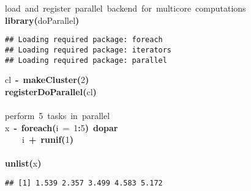 \documentclass[a4paper,12pt]{article}\usepackage{graphicx, color}
\makeatletter
\newcommand{\hlnumber}[1]{\textcolor[rgb]{0,0,0}{#1}}%
\newcommand{\hlfunctioncall}[1]{\textcolor[rgb]{0.501960784313725,0,0.329411764705882}{\textbf{#1}}}%
\newcommand{\hlkeyword}[1]{\textcolor[rgb]{0,0,0}{\textbf{#1}}}%
\newcommand{\hlargument}[1]{\textcolor[rgb]{0.690196078431373,0.250980392156863,0.0196078431372549}{#1}}%
\newcommand{\hlcomment}[1]{\textcolor[rgb]{0.180392156862745,0.6,0.341176470588235}{#1}}%
\newcommand{\hlassignement}[1]{\textcolor[rgb]{0,0,0}{\textbf{#1}}}%
\newcommand{\hlsymbol}[1]{\textcolor[rgb]{0,0,0}{#1}}%
\newcommand{\hlstd}[1]{\textcolor[rgb]{0,0,0}{#1}}%
\newenvironment{kframe}{%
 \def\FrameCommand##1{\hskip\@totalleftmargin \hskip-\fboxsep
 \colorbox{shadecolor}{##1}\hskip-\fboxsep
     \hskip-\linewidth \hskip-\@totalleftmargin \hskip\columnwidth}%
 \MakeFramed {\advance\hsize-\width
   \@totalleftmargin\z@ \linewidth\hsize
   \@setminipage}}%
 {\par\unskip\endMakeFramed}
\newenvironment{knitrout}{}{} %
\renewenvironment{knitrout}{\begin{footnotesize}}{\end{footnotesize}}
\makeatother
\begin{document}
\begin{knitrout}
\color{fgcolor}\begin{kframe}
\begin{flushleft}
\ttfamily\noindent
\hlcomment{\usebox{\hlnormalsizeboxhash}{\ }load{\ }and{\ }register{\ }parallel{\ }backend{\ }for{\ }multicore{\ }computations}\hspace*{\fill}\\
\hlstd{}\hlfunctioncall{library}\hlkeyword{(}\hlsymbol{doParallel}\hlkeyword{)}\mbox{}
\normalfont
\end{flushleft}
\begin{verbatim}
## Loading required package: foreach
## Loading required package: iterators
## Loading required package: parallel
\end{verbatim}
\begin{flushleft}
\ttfamily\noindent
\hlsymbol{cl}{\ }\hlassignement{\usebox{\hlnormalsizeboxlessthan}-}{\ }\hlfunctioncall{makeCluster}\hlkeyword{(}\hlnumber{2}\hlkeyword{)}\hspace*{\fill}\\
\hlstd{}\hlfunctioncall{registerDoParallel}\hlkeyword{(}\hlsymbol{cl}\hlkeyword{)}\hspace*{\fill}\\
\hlstd{}\hspace*{\fill}\\
\hlstd{}\hlcomment{\usebox{\hlnormalsizeboxhash}{\ }perform{\ }5{\ }tasks{\ }in{\ }parallel}\hspace*{\fill}\\
\hlstd{}\hlsymbol{x}{\ }\hlassignement{\usebox{\hlnormalsizeboxlessthan}-}{\ }\hlfunctioncall{foreach}\hlkeyword{(}\hlargument{i}{\ }\hlargument{=}{\ }\hlnumber{1}\hlkeyword{:}\hlnumber{5}\hlkeyword{)}{\ }\hlkeyword{\usebox{\hlnormalsizeboxpercent}dopar\usebox{\hlnormalsizeboxpercent}}{\ }\hlkeyword{\usebox{\hlnormalsizeboxopenbrace}}\hspace*{\fill}\\
\hlstd{}{\ }{\ }{\ }{\ }\hlsymbol{i}{\ }\hlkeyword{+}{\ }\hlfunctioncall{runif}\hlkeyword{(}\hlnumber{1}\hlkeyword{)}\hspace*{\fill}\\
\hlstd{}\hlkeyword{\usebox{\hlnormalsizeboxclosebrace}}\hspace*{\fill}\\
\hlstd{}\hlfunctioncall{unlist}\hlkeyword{(}\hlsymbol{x}\hlkeyword{)}\mbox{}
\normalfont
\end{flushleft}
\begin{verbatim}
## [1] 1.539 2.357 3.499 4.583 5.172
\end{verbatim}
\end{kframe}
\end{knitrout}
\end{document}
